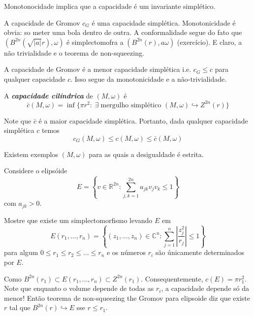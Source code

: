\begin{remark}\leavevmode
Monotonocidade implica que a capacidade é um invariante simplético.	
\end{remark}

A capacidade de Gromov $c_G$ é uma capacidade simplética. Monotonicidade é obvia: so meter uma bola dentro de outra. A conformalidade segue do fato que $(B^{2n}(\sqrt{|a|} r),\omega)$ é simplectomofra a $(B^{2n}(r),a\omega)$ (exercício). E claro, a não trivialidade e o teorema de non-squeezing.

	A capacidade de Gromov é a menor capacidade simplética i.e. $c_G\leq c$ para qualquer capacidade $c$. Isso segue da monotonicidade e a não-trivialidade.

\begin{defn}\leavevmode
A \textit{\textbf{capacidade cilíndrica}} de $(M,\omega)$ é \[\bar{c}(M,\omega)=\operatorname{inf}\{\pi r^2:\;\exists \; \text{mergulho simplético } (M,\omega)\hookrightarrow  Z^{2n}(r)\}\]
\end{defn}
Note que $\bar{c}$ é a maior capacidade simplética. Portanto, dada qualquer capacidade simplética $c$ temos
 \[c_G(M,\omega)\leq c(M,\omega)\leq \bar{c}(M,\omega)\]

\begin{remark}\leavevmode
	Existem exemplos $(M,\omega)$ para as quais a desigualdade é estrita.
\end{remark}

\begin{example}\leavevmode
	Considere o elipsóide
	\[E=\left\{ v \in\mathbb{R}^{2n}:\sum_{j,k=1}^{2n}a_{jk}v_jv_k\leq 1 \right\} \]
com $a_{jk}>0$.
\end{example}

\begin{exercise}\leavevmode
	Mostre que existe um simplectomorfismo levando  $E$ em
	\[E(r_1,\ldots,r_n)=\left\{ (z_1,\ldots,z_n)\in \mathbb{C}^n : \sum_{j=1}^n\left| \frac{z_j^2}{r_j} \right| \leq 1 \right\} \]
para algum $0 \leq  r_1 \leq  r_2 \leq \ldots\leq r_n$ e os números $r_i$ são únicamente determinados por $E$.
\end{exercise}

Como $B^{2n}(r_1)\subset E(r_1,\ldots,r_n)\subset Z^{2n}(r_1)$. Consequentemente, $c(E)=\pi r_1^2$. Note que enquanto o volume depende de todas as $r_i$, a capacidade depende só da menor! Então teorema de non-squeezing the Gromov para elipsoide diz que existe $r$ tal que $B^{2n}(r)\hookrightarrow  E$ sse $r \leq r_1$.

